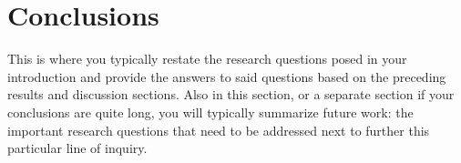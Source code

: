\section{Conclusions} \label{sec:conclusions}

This is where you typically restate the research questions posed in your introduction and provide the answers to said questions based on the preceding results and discussion sections. Also in this section, or a separate section if your conclusions are quite long, you will typically summarize future work: the important research questions that need to be addressed next to further this particular line of inquiry.